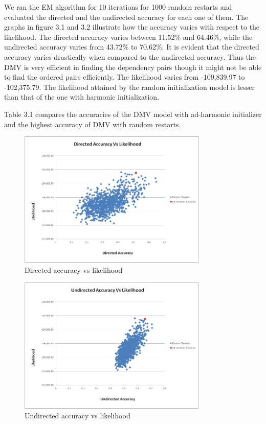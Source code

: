 \documentclass{book}
\begin{document}
We ran the EM algorithm for 10 iterations for 1000 random restarts and evaluated the directed and the undirected accuracy for each one of them. The graphs in figure 3.1 and 3.2 illustrate how the accuracy varies with respect to the likelihood. The directed accuracy varies between 11.52\% and 64.46\%, while the undirected accuracy varies from 43.72\% to 70.62\%. It is evident that the directed accuracy varies drastically when compared to the undirected accuracy. Thus the DMV is very efficient in finding the dependency pairs though it might not be able to find the ordered pairs efficiently. The likelihood varies from -109,839.97 to -102,375.79. The likelihood attained by the random initialization model is lesser than that of the one with harmonic initialization.

Table 3.1 compares the accuracies of the DMV model with ad-harmonic initializer and the highest accuracy of DMV with random restarts. 

\begin{figure}
\centering
\includegraphics[width=90mm]{images/directed_accuracy.png}
\caption{Directed accuracy vs likelihood}
\label{overflow}
\end{figure}

\begin{figure}
\centering
\includegraphics[width=90mm]{images/undirected_accuracy.png}
\caption{Undirected accuracy vs likelihood}
\label{overflow}
\end{figure}
\end{document}
